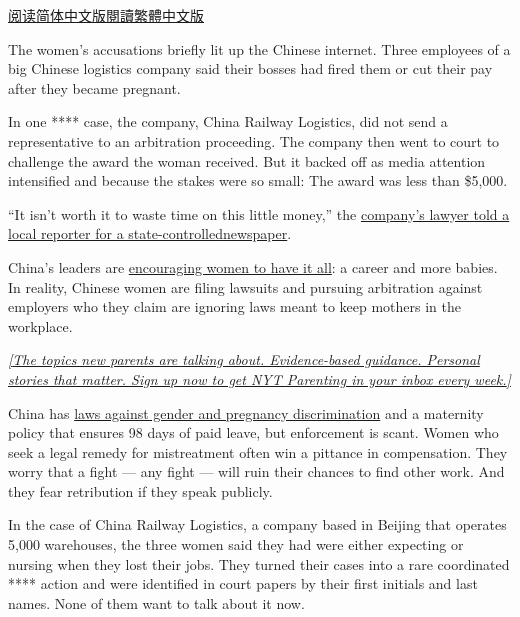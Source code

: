 \href{https://cn.nytimes.com/china/20191104/china-mothers-discrimination-working/}{阅读简体中文版}\href{https://cn.nytimes.com/china/20191104/china-mothers-discrimination-working/zh-hant/}{閱讀繁體中文版}

The women's accusations briefly lit up the Chinese internet. Three
employees of a big Chinese logistics company said their bosses had fired
them or cut their pay after they became pregnant.

In one **** case, the company, China Railway Logistics, did not send a
representative to an arbitration proceeding. The company then went to
court to challenge the award the woman received. But it backed off as
media attention intensified and because the stakes were so small: The
award was less than \$5,000.

``It isn't worth it to waste time on this little money,'' the
\href{http://www.bjnews.com.cn/news/2017/12/05/467293.html}{company's
lawyer told a local reporter for a
state-controlled}\href{http://www.bjnews.com.cn/news/2017/12/05/467293.html}{newspaper}.

China's leaders are
\href{https://www.nytimes.com/2018/08/11/world/asia/china-one-child-policy-birthrate.html}{encouraging
women to have it all}: a career and more babies. In reality, Chinese
women are filing lawsuits and pursuing arbitration against employers who
they claim are ignoring laws meant to keep mothers in the workplace.

\href{https://www.nytimes.com/newsletters/parenting?module=inline}{\emph{{[}The
topics new parents are talking about. Evidence-based guidance. Personal
stories that matter. Sign up now to get NYT Parenting in your inbox
every week.{]}}}

China has
\href{https://www.nytimes.com/2019/02/21/world/china-gender-discrimination-workplace.html}{laws
against gender and pregnancy discrimination} and a maternity policy that
ensures 98 days of paid leave, but enforcement is scant. Women who seek
a legal remedy for mistreatment often win a pittance in compensation.
They worry that a fight --- any fight --- will ruin their chances to
find other work. And they fear retribution if they speak publicly.

In the case of China Railway Logistics, a company based in Beijing that
operates 5,000 warehouses, the three women said they had were either
expecting or nursing when they lost their jobs. They turned their cases
into a rare coordinated **** action and were identified in court papers
by their first initials and last names. None of them want to talk about
it now.

